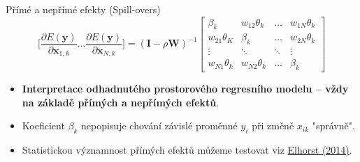 \documentclass{beamer}
\begin{document}
\begin{frame}{Přímé a nepřímé efekty (Spill-overs)}
$$ \bigg[\frac{\partial E(\bm{y})}{\partial \bm{x}_{1,k}} \dots \frac{\partial E(\bm{y})}{\partial \bm{x}_{N,k}}\bigg] =
(\bm{I} - \rho \bm{W})^{-1} 
\begin{bmatrix}
\beta_k & w_{12}\theta_k & \dots & w_{1N}\theta_k \\
w_{21}\theta_K & \beta_k & \dots & w_{2N}\theta_k \\
\vdots & \ddots & \ddots & \vdots \\
w_{N1}\theta_k & w_{N2}\theta_k & \dots & \beta_k 
\end{bmatrix}
$$
\begin{itemize}
\item \textbf{Interpretace odhadnutého prostorového regresního modelu – vždy na základě přímých a nepřímých efektů}. 
\item Koeficient $\beta_k$ nepopisuje chování závislé proměnné $y_i$ při změně $x_{ik}$ "správně".
\item Statistickou významnost přímých efektů můžeme testovat viz \href{https://www.google.cz/url?sa=t&rct=j&q=&esrc=s&source=web&cd=1&cad=rja&uact=8&ved=0ahUKEwjjwvLCk8bLAhXEvXIKHWSHBxsQFgggMAA&url=http://www.springer.com/cda/content/document/cda_downloaddocument/9783642403392-c2.pdf?SGWID\%3D0-0-45-1432965-p175381976&usg=AFQjCNGpme8ofJQzd46BCJVsUEio6oKIzQ&sig2=LlarV9wYhELGcTPiqzfRgg}{Elhorst (2014)}.	
\end{itemize}
\end{frame}
\end{document}
